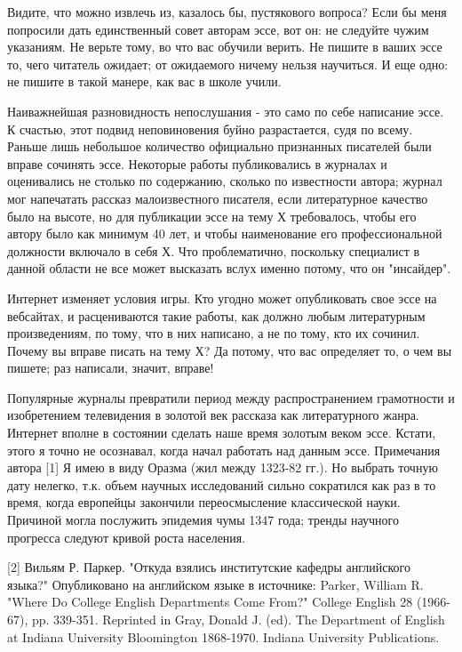 \documentclass[ebook,12pt,oneside,openany]{memoir}
\begin{document}
Видите, что можно извлечь из, казалось бы, пустякового вопроса? Если
бы меня попросили дать единственный совет авторам эссе, вот он: не
следуйте чужим указаниям. Не верьте тому, во что вас обучили верить.
Не пишите в ваших эссе то, чего читатель ожидает; от ожидаемого ничему
нельзя научиться. И еще одно: не пишите в такой манере, как вас в
школе учили.

Наиважнейшая разновидность непослушания - это само по себе написание
эссе. К счастью, этот подвид неповиновения буйно разрастается, судя по
всему. Раньше лишь небольшое количество официально признанных
писателей были вправе сочинять эссе. Некоторые работы публиковались в
журналах и оценивались не столько по содержанию, сколько по
известности автора; журнал мог напечатать рассказ малоизвестного
писателя, если литературное качество было на высоте, но для публикации
эссе на тему Х требовалось, чтобы его автору было как минимум 40 лет,
и чтобы наименование его профессиональной должности включало в себя Х.
Что проблематично, поскольку специалист в данной области не все может
высказать вслух именно потому, что он "инсайдер".

Интернет изменяет условия игры. Кто угодно может опубликовать свое
эссе на вебсайтах, и расцениваются такие работы, как должно любым
литературным произведениям, по тому, что в них написано, а не по тому,
кто их сочинил. Почему вы вправе писать на тему Х? Да потому, что вас
определяет то, о чем вы пишете; раз написали, значит, вправе!

Популярные журналы превратили период между распространением
грамотности и изобретением телевидения в золотой век рассказа как
литературного жанра. Интернет вполне в состоянии сделать наше время
золотым веком эссе. Кстати, этого я точно не осознавал, когда начал
работать над данным эссе. Примечания автора [1] Я имею в виду Оразма
(жил между 1323-82 гг.). Но выбрать точную дату нелегко, т.к. объем
научных исследований сильно сократился как раз в то время, когда
европейцы закончили переосмысление классической науки. Причиной могла
послужить эпидемия чумы 1347 года; тренды научного прогресса следуют
кривой роста населения.

[2] Вильям Р. Паркер. "Откуда взялись институтские кафедры английского
языка?" Опубликовано на английском языке в источнике: Parker, William
R. "Where Do College English Departments Come From?" College English
28 (1966-67), pp. 339-351. Reprinted in Gray, Donald J. (ed). The
Department of English at Indiana University Bloomington 1868-1970.
Indiana University Publications.
\end{document}
